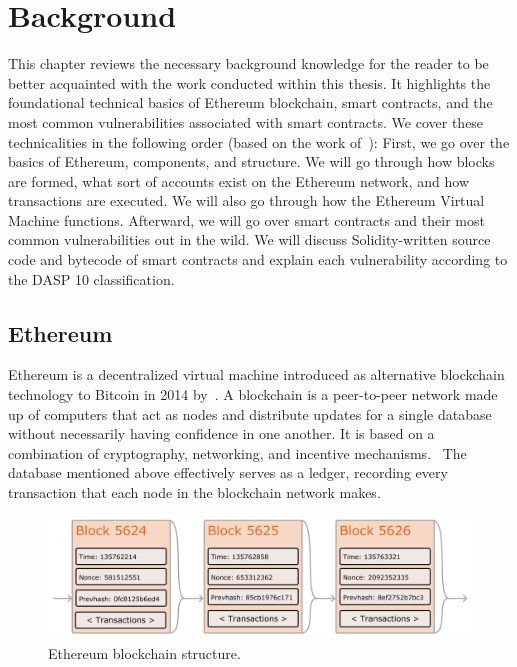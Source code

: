 
\chapter{Background}
\label{chap:background}
    This chapter reviews the necessary background knowledge for the reader to be better acquainted with the work conducted within this thesis.
    It highlights the foundational technical basics of Ethereum blockchain, smart contracts, and the most common vulnerabilities associated with smart contracts.
    We cover these technicalities in the following order (based on the work of~\cite{ferreira2022smart}):
        First, we go over the basics of Ethereum, components, and structure. We will go through how blocks are formed,
        what sort of accounts exist on the Ethereum network, and how transactions are executed.
        We will also go through how the Ethereum Virtual Machine functions.
        Afterward, we will go over smart contracts and their most common vulnerabilities out in the wild.
        We will discuss Solidity-written source code and bytecode of smart contracts and explain each vulnerability according to the DASP 10 classification.~\cite{dasp}


\section{Ethereum}
    Ethereum is a decentralized virtual machine introduced as alternative blockchain technology to Bitcoin in 2014 by~\cite{wood2014ethereum}.
    A blockchain is a peer-to-peer network made up of computers that act as nodes and distribute updates for a single database without necessarily having confidence in one another.
    It is based on a combination of cryptography, networking, and incentive mechanisms.~\cite{wohrer2018smart}
    The database mentioned above effectively serves as a ledger, recording every transaction that each node in the blockchain network makes. 


    \begin{figure}
        \centering
        \includegraphics[width=\textwidth]{figures/ethereum-blocks.png}
        \caption{Ethereum blockchain structure.}
        \label{fig:ethereumBlockchainStructure}
    \end{figure}

